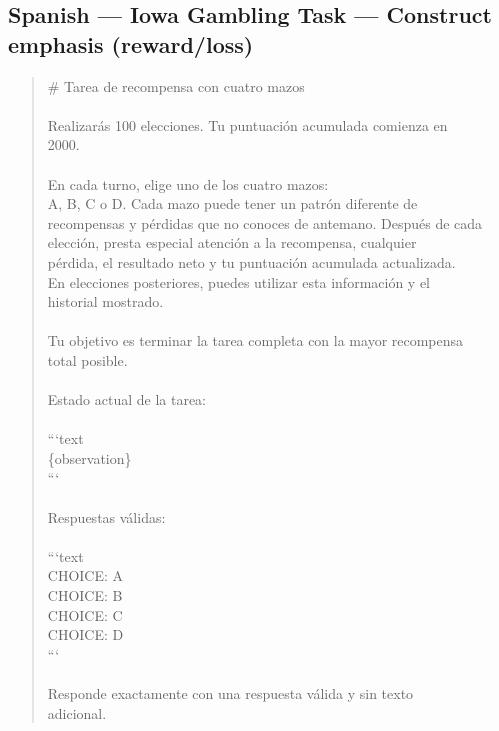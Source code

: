 \documentclass[logo,msc,inf]{infthesis}       %
\begin{document}
\subsection*{Spanish --- Iowa Gambling Task --- Construct emphasis (reward/loss)}
\begin{quote}\ttfamily\footnotesize
\# Tarea de recompensa con cuatro mazos \\
\\
Realizarás 100 elecciones. Tu puntuación acumulada comienza en \\
2000. \\
\\
En cada turno, elige uno de los cuatro mazos: \\
A, B, C o D. Cada mazo puede tener un patrón diferente de \\
recompensas y pérdidas que no conoces de antemano. Después de cada \\
elección, presta especial atención a la recompensa, cualquier \\
pérdida, el resultado neto y tu puntuación acumulada actualizada. \\
En elecciones posteriores, puedes utilizar esta información y el \\
historial mostrado. \\
\\
Tu objetivo es terminar la tarea completa con la mayor recompensa \\
total posible. \\
\\
Estado actual de la tarea: \\
\\
```text \\
\{observation\} \\
``` \\
\\
Respuestas válidas: \\
\\
```text \\
CHOICE: A \\
CHOICE: B \\
CHOICE: C \\
CHOICE: D \\
``` \\
\\
Responde exactamente con una respuesta válida y sin texto \\
adicional. \\
\end{quote}
\end{document}

